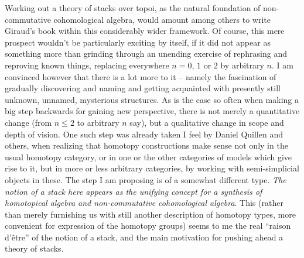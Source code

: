Working out a theory of stacks over topoi, as the natural foundation
of non-commutative cohomological algebra, would amount among others to
write Giraud's book within this considerably wider framework. Of
course, this mere prospect wouldn't be particularly exciting by
itself, if it did not appear as something more than grinding through
an unending exercise of rephrasing and reproving known things,
replacing everywhere $n=0$, $1$ or $2$ by arbitrary $n$. I am
convinced however that there is a lot more to it -- namely the
fascination of gradually discovering and naming and getting acquainted
with presently still unknown, unnamed, mysterious structures. As is
the case so often when making a big step backwards for gaining new
perspective, there is not merely a quantitative change (from $n\le2$
to arbitrary $n$ say), but a qualitative change in scope and depth of
vision. One such step was already taken I feel by Daniel Quillen and
others, when realizing that homotopy constructions make sense not only
in the usual homotopy category, or in one or the other categories of
models which give rise to it, but in more or less arbitrary
categories, by working with semi-simplicial objects in these. The step
I am proposing is of a somewhat different type. \emph{The notion of a
stack here appears as the unifying concept for a synthesis of
homotopical algebra and non-commutative cohomological algebra}. This (rather than merely furnishing us
with still another description of homotopy types, more convenient for
expression of the homotopy groups) seems to me the real ``raison
d'\^etre'' of the notion of a stack, and the main motivation for
pushing ahead a theory of stacks.

